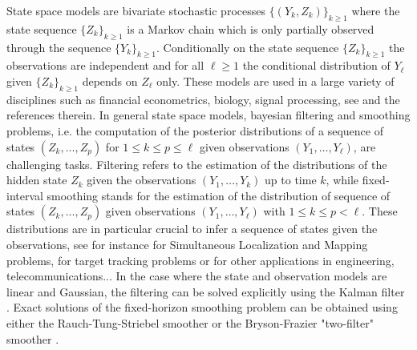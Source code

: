 %


State space models are bivariate stochastic processes $\{(Y_k,Z_k)\}_{k\ge 1}$ where the state sequence $\{Z_k\}_{k\ge 1}$ is a Markov chain which is only partially observed through the sequence $\{Y_k\}_{k\ge 1}$. Conditionally on the state sequence $\{Z_k\}_{k\ge 1}$ the observations are independent and for all $\ell\ge 1$ the conditional distribution of $Y_{\ell}$ given $\{Z_k\}_{k\ge 1}$ depends on $Z_{\ell}$ only. These models are used in a large variety of disciplines such as financial econometrics, biology, signal processing, see \cite{delmoral:2013} and the references therein. In general state space models, bayesian filtering and smoothing problems, i.e. the computation of the posterior distributions of a sequence of states $(Z_{k},\ldots,Z_{p})$ for $1\le k\le p\le \ell$ given observations $(Y_{1},\ldots,Y_{\ell})$, are challenging tasks. Filtering refers to the estimation of the distributions of the hidden state $Z_k$ given the observations $(Y_1,\ldots,Y_k)$ up to time $k$, while fixed-interval smoothing stands for the estimation of the distribution of sequence of states $(Z_{k},\ldots,Z_{p})$ given observations $(Y_{1},\ldots,Y_{\ell})$ with $1\le k\le p<\ell$. These distributions are in particular crucial to infer a sequence of states given the observations, see for instance \cite{thrun:burgard:fox:2005} for Simultaneous Localization and Mapping problems, \cite{barshalom:li:kirubarjan:2001} for target tracking problems or \cite{sarkka:2013,douc:moulines:stoffer:2013} for other applications in engineering, telecommunications... In the case where the state and observation models are linear and Gaussian, the filtering can be solved explicitly using the Kalman filter \cite{kalman:1960}. Exact solutions of the fixed-horizon smoothing problem can be obtained using either the Rauch-Tung-Striebel smoother \cite{rauch:striebel:tung:1965} or the Bryson-Frazier "two-filter" smoother \cite{bryson:frazier:1963}. %
